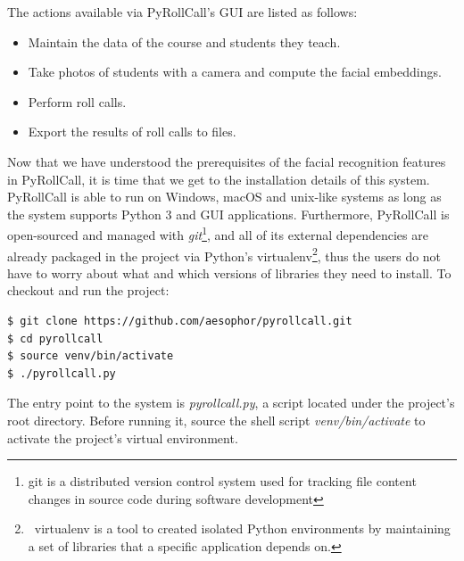 

The actions available via PyRollCall's GUI are listed as follows:
\vspace{0.5cm}

\begin{itemize}
  \item Maintain the data of the course and students they teach.
  \item Take photos of students with a camera and compute the facial embeddings.
  \item Perform roll calls.
  \item Export the results of roll calls to files.
\end{itemize}
\setstretch{\myContentLineSpacing}


\vspace{0.5cm}
Now that we have understood the prerequisites of the facial recognition features in PyRollCall,
it is time that we get to the installation details of this system. PyRollCall is able to run on Windows,
macOS and unix-like systems as long as the system supports Python 3 and GUI applications.
Furthermore, PyRollCall is open-sourced and managed with \emph{git}\footnote{git is a distributed
  version control system used for tracking file content changes in source code during software development},
and all of its external dependencies are already packaged in the project via Python's {virtualenv}\footnote{\
  virtualenv is a tool to created isolated Python environments by maintaining a set of libraries that a specific application depends on.},
thus the users do not have to worry about what and which versions of libraries they need to install. To checkout and run the project:



\begin{lstlisting}[numbers=none,xleftmargin=0em,caption={Shell commands to checkout and run PyRollCall}]
$ git clone https://github.com/aesophor/pyrollcall.git
$ cd pyrollcall
$ source venv/bin/activate
$ ./pyrollcall.py 
\end{lstlisting}

The entry point to the system is \emph{pyrollcall.py}, a script located under the project's root directory.
Before running it, source the shell script \emph{venv/bin/activate} to activate the project's virtual environment.
